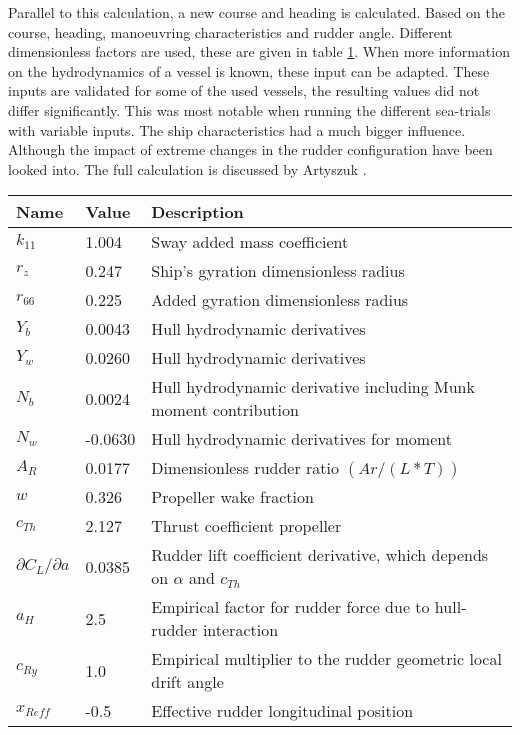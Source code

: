 Parallel to this calculation, a new course and heading is calculated. Based on the course, heading, manoeuvring characteristics and rudder angle. Different dimensionless factors are used, these are given in table \ref{tab:dimensionless-factors}. When more information on the hydrodynamics of a vessel is known, these input can be adapted. These inputs are validated for some of the used vessels, the resulting values did not differ significantly. This was most notable when running the different sea-trials with variable inputs. The ship characteristics had a much bigger influence. Although the impact of extreme changes in the rudder configuration have been looked into. The full calculation is discussed by Artyszuk \cite{Artyszuk2016}. 


\begin{table}[p]
	\centering
	\begin{tabular}{p{}|p{}|p{}}
		\toprule
		Name & Value & Description\\
		\midrule
		$k_{11}$ & 1.004 & Sway added mass coefficient \\
		$r_{z}$ & 0.247 & Ship's gyration dimensionless radius \\
		$r_{66}$ & 0.225 & Added gyration dimensionless radius \\
		$Y_{b}$ & 0.0043 & Hull hydrodynamic derivatives\\
		$Y_{w}$ & 0.0260 & Hull hydrodynamic derivatives\\
		$N_{b}$ & 0.0024 & Hull hydrodynamic derivative including Munk moment contribution \\
		$N_{w}$ & -0.0630 & Hull hydrodynamic derivatives for moment\\
		$A_{R}$ & 0.0177 & Dimensionless rudder ratio $(Ar/(L*T))$ \\
		$w$ & 0.326 & Propeller wake fraction \\
		$c_{Th}$ & 2.127 & Thrust coefficient propeller \\
		$\partial C_{L} / \partial a$ & 0.0385 & Rudder lift coefficient derivative, which depends on $\alpha$ and $c_{Th}$ \\
		
		$a_{H}$ & 2.5 & Empirical factor for rudder force due to hull‐rudder interaction \\
		$c_{Ry}$ & 1.0 & Empirical multiplier to the rudder geometric local drift angle \\
		$x_{Reff}$ & -0.5 & Effective rudder longitudinal position \\
		\bottomrule
	\end{tabular}
	
	\label{tab:dimensionless-factors}
\end{table}


